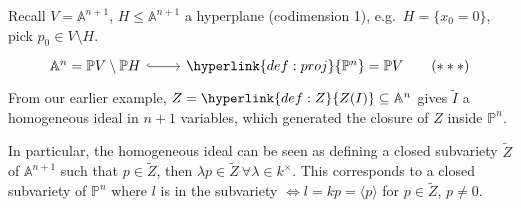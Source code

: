 \documentclass{article}
\newcommand{\A}{\mathbb{A}}
\newcommand{\proj}{\mathbb{P}}
\begin{document}

Recall $V = \A^{n+1}$, $H \leq \A^{n+1}$ a hyperplane (codimension 1), e.g.\ $H = \{x_0 = 0\}$, pick $p_0 \in V \setminus H$.
\begin{equation*}
    \begin{tikzcd}
        \A^n = \proj V \setminus \proj H \rar[hookrightarrow ] & \hyperlink{def:proj}{\proj^n} = \proj V \label{eq:8tripstar} \tag{$***$}
    \end{tikzcd}
\end{equation*}
From our earlier example, $Z = \hyperlink{def:Z}{Z(I)} \subseteq \A^n$ gives \hyperlink{def:twiddle}{$\tilde{I}$} a homogeneous ideal in $n+1$ variables, which generated the closure of $Z$ inside $\proj^n$.

In particular, the homogeneous ideal can be seen as defining a closed subvariety $\tilde{Z}$ of $\A^{n+1}$ such that $p \in \tilde{Z}$, then $\lambda p \in \tilde{Z} \ \forall \lambda \in k^\times$.
This corresponds to a closed subvariety of $\proj^n$ where $l$  is in the subvariety $\iff l = k p = \langle p \rangle$ for $p \in \tilde{Z}$, $p \neq 0$.
\end{document}
